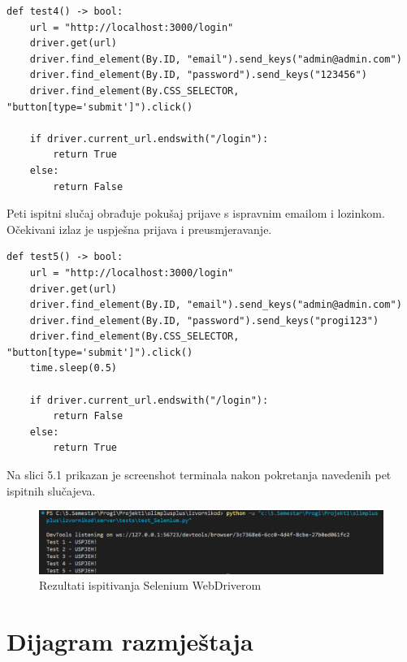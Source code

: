 \lstset{language=Python, xleftmargin=0pt}
\begin{lstlisting}
def test4() -> bool:
    url = "http://localhost:3000/login"
    driver.get(url)
    driver.find_element(By.ID, "email").send_keys("admin@admin.com")
    driver.find_element(By.ID, "password").send_keys("123456")
    driver.find_element(By.CSS_SELECTOR, "button[type='submit']").click()

    if driver.current_url.endswith("/login"):
        return True
    else:
        return False
\end{lstlisting}

Peti ispitni slučaj obrađuje pokušaj prijave s ispravnim emailom i lozinkom. Očekivani izlaz je uspješna prijava i preusmjeravanje. 

\lstset{language=Python, xleftmargin=0pt}
\begin{lstlisting}
def test5() -> bool:
    url = "http://localhost:3000/login"
    driver.get(url)
    driver.find_element(By.ID, "email").send_keys("admin@admin.com")
    driver.find_element(By.ID, "password").send_keys("progi123")
    driver.find_element(By.CSS_SELECTOR, "button[type='submit']").click()
    time.sleep(0.5)

    if driver.current_url.endswith("/login"):
        return False
    else:
        return True
\end{lstlisting}

Na slici 5.1 prikazan je screenshot terminala nakon pokretanja navedenih pet ispitnih slučajeva.

\begin{figure}[htp]
    \includegraphics[scale=0.5]{dijagrami/testsScreenshot.png}
    \centering
    \caption{Rezultati ispitivanja Selenium WebDriverom}
\end{figure}

\eject

		
		\section{Dijagram razmještaja}
			
